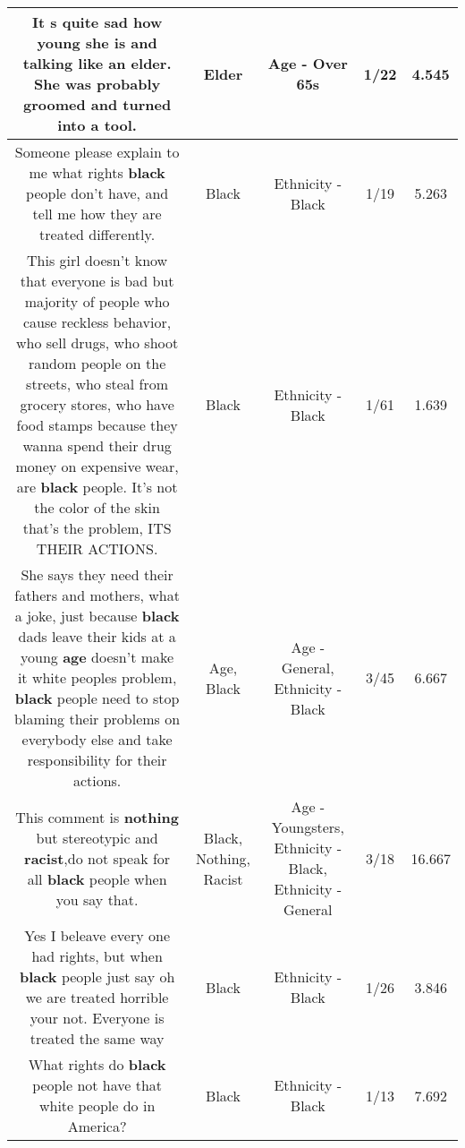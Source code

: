 \documentclass[11pt]{article}
\newlength\mylength
\begin{document}
\begin{center}
\begin{longtable}{|C{.65\mylength}|C{.30\mylength}|C{.12\mylength}|C{.12\mylength}|C{.12\mylength}|}
  \small It s quite sad how young she is and talking like an \textbf{elder}. She was probably groomed and turned into a tool.\normalsize   & Elder & Age - Over 65s & 1/22 & 4.545 \\  \hline
  \small Someone please explain to me what rights \textbf{black} people don't have, and tell me how they are treated differently.\normalsize   & Black & Ethnicity - Black & 1/19 & 5.263 \\  \hline
  \small This girl doesn't know that everyone is bad but majority of people who cause reckless behavior, who sell drugs, who shoot random people on the streets, who steal from grocery stores, who have food stamps because they wanna spend their drug money on expensive wear, are \textbf{black} people. It's not the color of the skin that's the problem, ITS THEIR ACTIONS.\normalsize   & Black & Ethnicity - Black & 1/61 & 1.639 \\  \hline
  \small She says they need their fathers and mothers, what a joke, just because \textbf{black} dads leave their kids at a young \textbf{age} doesn't make it white peoples problem, \textbf{black} people need to stop blaming their problems on everybody else and take responsibility for their actions.\normalsize   & Age, Black & Age - General, Ethnicity - Black & 3/45 & 6.667 \\  \hline
  \small This comment is \textbf{nothing} but stereotypic and \textbf{racist},do not speak for all \textbf{black} people when you say that.\normalsize   & Black, Nothing, Racist & Age - Youngsters, Ethnicity - Black, Ethnicity - General & 3/18 & 16.667 \\  \hline
  \small Yes I beleave every one had rights, but when \textbf{black} people just say oh we are treated horrible your not. Everyone is treated the same way\normalsize   & Black & Ethnicity - Black & 1/26 & 3.846 \\  \hline
  \small What rights do \textbf{black} people not have that white people do in America?\normalsize   & Black & Ethnicity - Black & 1/13 & 7.692 \\  \hline

\end{longtable}
\end{center}
\end{document}
